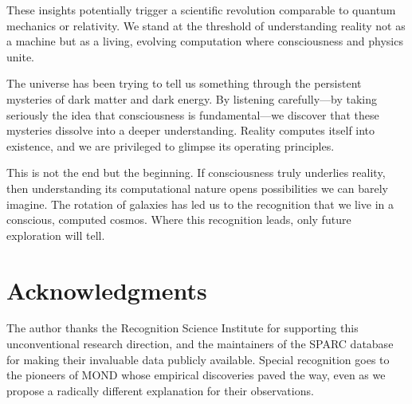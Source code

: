 \documentclass[10pt,a4paper]{article}
\begin{document}
These insights potentially trigger a scientific revolution comparable to quantum mechanics or relativity. We stand at the threshold of understanding reality not as a machine but as a living, evolving computation where consciousness and physics unite.

The universe has been trying to tell us something through the persistent mysteries of dark matter and dark energy. By listening carefully---by taking seriously the idea that consciousness is fundamental---we discover that these mysteries dissolve into a deeper understanding. Reality computes itself into existence, and we are privileged to glimpse its operating principles.

This is not the end but the beginning. If consciousness truly underlies reality, then understanding its computational nature opens possibilities we can barely imagine. The rotation of galaxies has led us to the recognition that we live in a conscious, computed cosmos. Where this recognition leads, only future exploration will tell.

\section*{Acknowledgments}

The author thanks the Recognition Science Institute for supporting this unconventional research direction, and the maintainers of the SPARC database for making their invaluable data publicly available. Special recognition goes to the pioneers of MOND whose empirical discoveries paved the way, even as we propose a radically different explanation for their observations.
\end{document}
